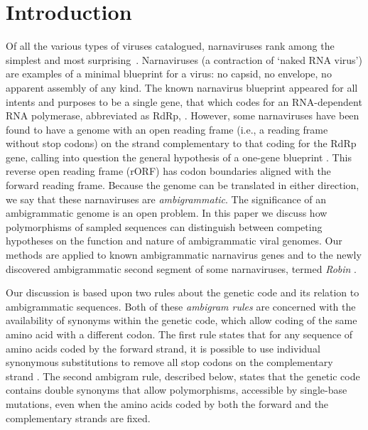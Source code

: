 \documentclass[unnumsec,webpdf,contemporary,large,namedate]{oup-authoring-template}%
\theoremstyle{thmstyleone}%
\theoremstyle{thmstyletwo}%
\theoremstyle{thmstylethree}%
\begin{document}
\maketitle


\section{Introduction}
\label{sec: 1}
Of all the various types of viruses catalogued, narnaviruses rank among the simplest
and most surprising~\citep{Cob+16}.  Narnaviruses (a contraction of \lq naked RNA virus')
are examples of a minimal blueprint for a virus: no capsid, no envelope, no apparent
assembly of any kind. The known narnavirus blueprint appeared for all intents and purposes 
to be a single gene, that which codes for an RNA-dependent RNA polymerase,
abbreviated as RdRp, \citep{Hillman2013}. However, some narnaviruses
have been found to have a genome with an open reading frame (i.e., a reading frame without
stop codons) on the strand complementary to that coding for the RdRp gene, calling into 
question the general hypothesis of a one-gene blueprint \citep{DeR+19,Din+20,Cep20}.
This reverse open reading frame (rORF) has codon boundaries aligned with the forward reading
frame. Because the genome can be translated in either direction, we say that these narnaviruses
are \emph{ambigrammatic}. The significance of an ambigrammatic genome is an open problem.
In this paper we discuss how polymorphisms of sampled sequences can distinguish
between competing hypotheses on the function and nature of ambigrammatic viral genomes.
Our methods are applied to known ambigrammatic narnavirus genes and to the newly
discovered ambigrammatic second segment of some narnaviruses, termed \emph{Robin} \citep{Bat+20}.

Our discussion is based upon two rules about the genetic code and its relation to ambigrammatic
sequences. Both of these \emph{ambigram rules} are concerned with the availability of synonyms within
the genetic code, which allow coding of the same amino acid with a different codon.
The first rule states that for any sequence of amino acids coded by the forward strand,
it is possible to use individual synonymous substitutions to remove
all stop codons on the complementary strand \citep[this result was discussed already in][]{DeR+19}.
The second ambigram rule, described below, states that the genetic code contains double
synonyms that allow polymorphisms, accessible by single-base mutations, even when the
amino acids coded by both the forward and the complementary strands are fixed.
\end{document}
